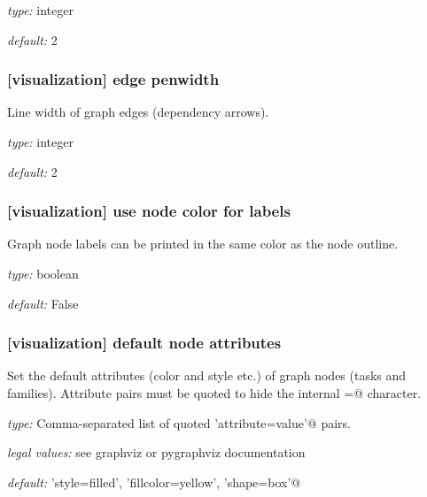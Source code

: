 \begin{myitemize}
    \item {\em type:} integer
    \item {\em default:} 2
\end{myitemize}

\subsubsection[edge penwidth]{[visualization] \textrightarrow edge penwidth}

Line width of graph edges (dependency arrows).

\begin{myitemize}
    \item {\em type:} integer
    \item {\em default:} 2
\end{myitemize}

\subsubsection[use node color for labels]{[visualization] \textrightarrow use node color for labels}

Graph node labels can be printed in the same color as the node outline.

\begin{myitemize}
    \item {\em type:} boolean
    \item {\em default:} False
\end{myitemize}


\subsubsection[default node attributes]{[visualization] \textrightarrow default node attributes}

Set the default attributes (color and style etc.) of graph nodes (tasks and families).
Attribute pairs must be quoted to hide the internal \lstinline@=@ character.

\begin{myitemize}
    \item {\em type:} Comma-separated list of quoted \lstinline@'attribute=value'@ pairs.
    \item {\em legal values:} see graphviz or pygraphviz documentation
    \item {\em default:} \lstinline@'style=filled', 'fillcolor=yellow', 'shape=box'@
\end{myitemize}

